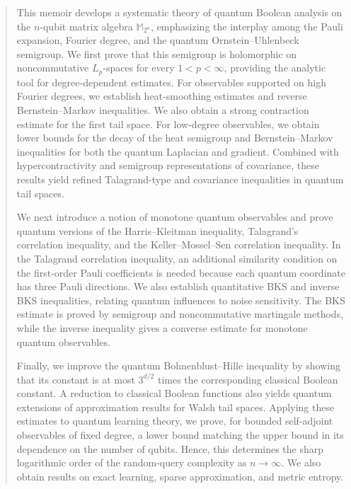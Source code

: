 \documentclass{amsbook}
\theoremstyle{definition}
\theoremstyle{remark}
\numberwithin{section}{chapter}
\numberwithin{equation}{chapter}
\newcommand{\1}{\mathbf{1}}
\begin{document}
\begin{abstract}
This memoir develops a systematic theory of quantum Boolean analysis on the $n$-qubit matrix algebra $\mathbb{M}_{2^{n}}$, emphasizing the interplay among the Pauli expansion, Fourier degree, and the quantum Ornstein--Uhlenbeck semigroup. We first prove that this semigroup is holomorphic on noncommutative $L_p$-spaces for every $1<p<\infty$, providing the analytic tool for degree-dependent estimates.
For observables supported on high Fourier degrees, we establish heat-smoothing estimates and reverse Bernstein--Markov inequalities. We also obtain a strong contraction estimate for the first tail space. 
For  low-degree observables, we obtain lower bounds for the decay of the heat semigroup and Bernstein--Markov inequalities for both the quantum Laplacian and gradient. Combined with hypercontractivity and semigroup representations of covariance, these results yield refined Talagrand-type and covariance inequalities in quantum tail spaces.



We next introduce a notion of monotone quantum observables and prove quantum versions of the Harris--Kleitman inequality, Talagrand's correlation inequality, and the Keller--Mossel--Sen correlation inequality. 
In the Talagrand correlation inequality, an additional similarity condition on the first-order Pauli coefficients is needed because each quantum coordinate has three Pauli directions. We also establish quantitative BKS and inverse BKS inequalities, relating quantum influences to noise sensitivity. The BKS estimate is proved by  semigroup and noncommutative martingale methods, while the inverse inequality gives a converse estimate for monotone quantum observables.


Finally, we improve the  quantum Bohnenblust--Hille inequality  by showing that its constant is at most $3^{d/2}$ times the corresponding classical Boolean constant. A reduction to classical Boolean functions also yields quantum extensions of approximation results for Walsh tail spaces. Applying these estimates to quantum learning theory,  we prove, for bounded self-adjoint observables of fixed degree, a lower bound matching the upper bound in its dependence on the number of qubits.  Hence, this determines the sharp logarithmic order of the random-query complexity as $n\to\infty$. We also obtain results on exact learning, sparse approximation, and metric entropy.
\end{abstract}

\maketitle
\end{document}
